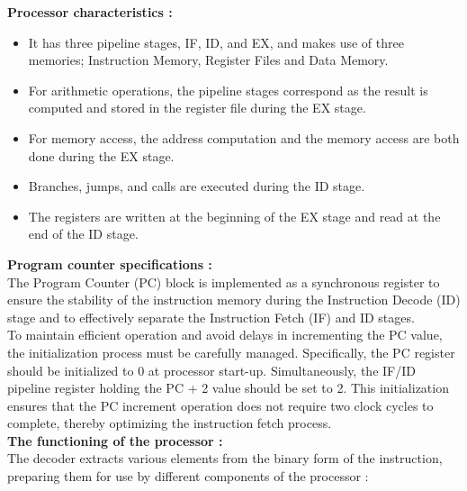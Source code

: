 \documentclass[a4paper,12pt]{article}
\begin{document}
\textbf{Processor characteristics :}

\begin{itemize}
    \item It has three pipeline stages, IF, ID, and EX, and makes use of three memories; Instruction Memory, Register Files and Data Memory.
    \item For arithmetic operations, the pipeline stages correspond as the result is computed and stored in the register file during the EX stage.
    \item For memory access, the address computation and the memory access are both done during the EX stage.
    \item Branches, jumps, and calls are executed during the ID stage.
    \item The registers are written at the beginning of the EX stage and read at the end of the ID stage.
\end{itemize}

\textbf{Program counter specifications :} \\

The Program Counter (PC) block is implemented as a synchronous register to ensure the stability of the instruction memory during the Instruction Decode (ID) stage and to effectively separate the Instruction Fetch (IF) and ID stages.\\

To maintain efficient operation and avoid delays in incrementing the PC value, the initialization process must be carefully managed. Specifically, the PC register should be initialized to 0 at processor start-up. Simultaneously, the IF/ID pipeline register holding the PC + 2 value should be set to 2. This initialization ensures that the PC increment operation does not require two clock cycles to complete, thereby optimizing the instruction fetch process.\\

\textbf{The functioning of the processor : }\\

The decoder extracts various elements from the binary form of the instruction, preparing them for use by different components of the processor :
\end{document}
